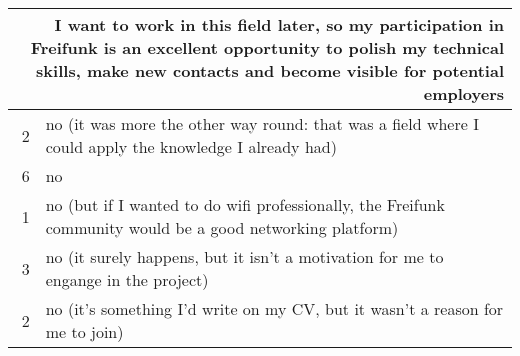\begin{table}[h]
  \begin{tabular}{| r | p{\textwidth} |}
    \hline
    \multicolumn{2}{|p{\textwidth}|}{I want to work in this field later, so my participation in Freifunk is an excellent opportunity to polish my technical skills, make new contacts and become visible for potential employers} \\
    \hline
    2 & no (it was more the other way round: that was a field where I could apply the knowledge I already had) \\
    6 & no \\
    1 & no (but if I wanted to do wifi professionally, the Freifunk community would be a good networking platform) \\
    3 & no (it surely happens, but it isn't a motivation for me to engange in the project) \\
    2 & no (it's something I'd write on my CV, but it wasn't a reason for me to join) \\
    \hline
  \end{tabular}
\end{table}


